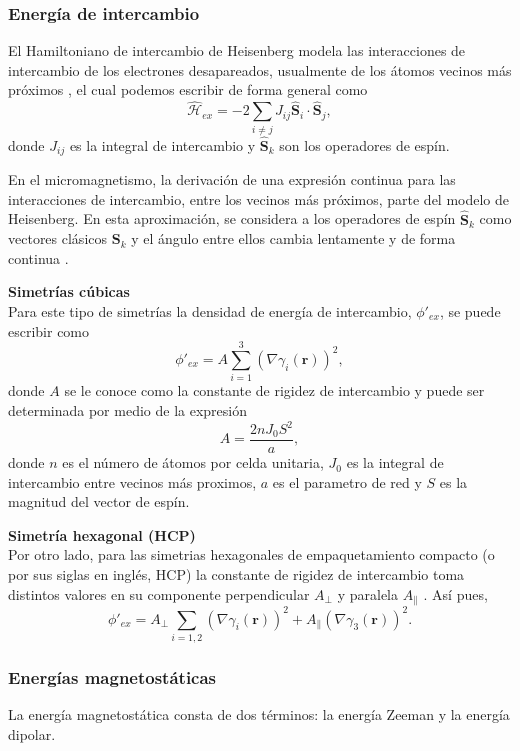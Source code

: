 \subsubsection{Energía de intercambio}
El Hamiltoniano de intercambio de Heisenberg modela las interacciones de intercambio de los electrones desapareados, usualmente de los átomos vecinos más próximos \cite{coey_2010}, el cual podemos escribir de forma general como \[ \hat{\mathcal{H}}_{ex} = - 2 \sum_{i \neq j} J_{ij} \hat{\mathbf{S}}_i \cdot \hat{\mathbf{S}}_j ,\] donde $J_{ij}$ es la integral de intercambio y $\hat{\mathbf{S}}_k$ son los operadores de espín.

\vspace{10pt}

En el micromagnetismo, la derivación de una expresión continua para las interacciones de intercambio, entre los vecinos más próximos, parte del modelo de Heisenberg. En esta aproximación, se considera a los operadores de espín $\hat{\mathbf{S}}_k$ como vectores clásicos $\mathbf{S}_k$ y el ángulo entre ellos cambia lentamente y de forma continua \cite{Exl2020}. 

\vspace{10pt}

\textbf{Simetrías cúbicas}\\
Para este tipo de simetrías la densidad de energía de intercambio, $\phi'_{ex}$, se puede escribir como \[ \phi'_{ex} = A \sum_{i=1}^3 (\nabla \gamma_i (\mathbf{r}) )^2 ,\] donde $A$ se le conoce como la constante de rigidez de intercambio y puede ser determinada por medio de la expresión \cite{kittel1949} \[ A = \frac{2nJ_0S^2}{a}, \]donde $n$ es el número de átomos por celda unitaria, $J_0$ es la integral de intercambio entre vecinos más proximos, $a$ es el parametro de red y $S$ es la magnitud del vector de espín.

\vspace{10pt}

\textbf{Simetría hexagonal (HCP)}\\
Por otro lado, para las simetrias hexagonales de empaquetamiento compacto (o por sus siglas en inglés, HCP) la constante de rigidez de intercambio toma distintos valores en su componente perpendicular $A_\perp$ y paralela $A_\|$ \cite{KronmüllerMicromagnetism}. Así pues, \[ \phi'_{ex} = A_\perp \sum_{i=1,2} (\nabla \gamma_i (\mathbf{r}) )^2 + A_\| (\nabla \gamma_3 (\mathbf{r}) )^2.\]

\subsubsection{Energías magnetostáticas}
La energía magnetostática consta de dos términos: la energía Zeeman y la energía dipolar.

